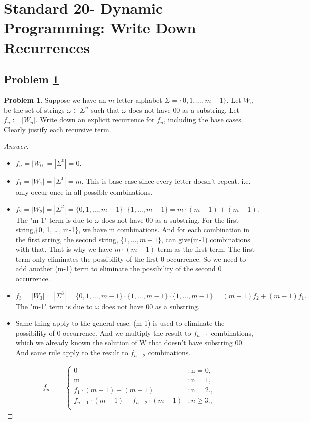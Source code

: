 \documentclass[11pt]{article}
\theoremstyle{definition}
\theoremstyle{definition}
\newtheorem{required}{Problem}
\theoremstyle{definition}
\begin{document}
\newpage
\section{Standard 20- Dynamic Programming: Write Down Recurrences}

\subsection{Problem \ref{DP3}}

\begin{required} \label{DP3}
Suppose we have an $m$-letter alphabet $\Sigma = \{0, 1, \ldots, m-1\}$. Let $W_{n}$ be the set of strings $\omega \in \Sigma^{n}$ such that $\omega$ does not have $00$ as a substring. Let $f_{n} := |W_{n}|$. Write down an explicit recurrence for $f_{n}$, including the base cases. Clearly justify each recursive term.
\end{required}

\begin{proof}[Answer]
\begin{itemize}
\item $f_n = |W_0|  = |\Sigma^{0}| = 0$.
\item $f_1 = |W_1|  = |\Sigma^{1}| = m$. This is base case since every letter doesn't repeat. i.e. only occur once in all possible combinations.
\item $f_2 = |W_2|  = |\Sigma^{2}| = \{0, 1, \ldots, m-1\} \cdot \{1, \ldots, m-1\}= m\cdot (m-1) + (m-1).$ The "m-1" term is due to $\omega$ does not have $00$ as a substring. For the first string,\{0, 1, \ldots, m-1\}, we have m combinations. And for each combination in the first string, the second string, $\{1, \ldots, m-1\}$, can give(m-1) combinations with that. That is why we have $m\cdot (m-1)$ term as the first term. The first term only eliminates the possibility of the first $0$ occurrence. So we need to add another (m-1) term to eliminate the possibility of the second $0$ occurrence.
\item $f_3 = |W_3|  = |\Sigma^{3}| = \{0, 1, \ldots, m-1\} \cdot \{1, \ldots, m-1\} \cdot \{1, \ldots, m-1\}= (m-1)f_2 + (m-1)f_1.$ The "m-1" term is due to $\omega$ does not have $00$ as a substring.
\item Same thing apply to the general case. (m-1) is used to eliminate the possibility of $0$ occurrence. And we multiply the result to $f_{n-1}$ combinations, which we already known the solution of W that doesn't have substring $00$. And same rule apply to the result to $f_{n-2}$ combinations.
\end{itemize}

\begin{align*}
f_{n} &= \begin{cases} \text{0} & : \text{n = 0}, \\ 
\text{m} & : \text{n = 1},\\
\text{$f_1\cdot (m-1) + (m-1)$} & : \text{n = 2}.,\\
\text{$f_{n-1}\cdot (m-1) + f_{n-2}\cdot(m-1)$} & : \text{$n \geq 3$}.,\\
\end{cases}
\end{align*}
\end{proof}
\end{document}
